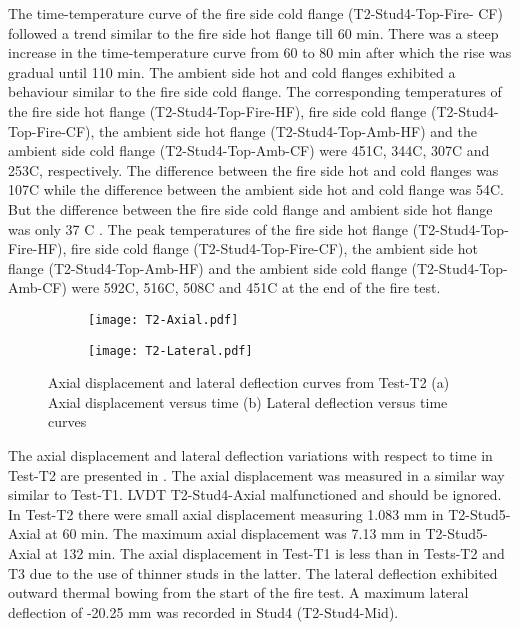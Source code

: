 The time-temperature curve of the fire side cold flange (T2-Stud4-Top-Fire- CF) followed a trend similar to the fire side hot flange till 60 min. There was a steep increase in the time-temperature curve from 60 to 80 min after which the rise was gradual until 110 min. The ambient side hot and cold flanges exhibited a behaviour similar to the fire side cold flange. The corresponding temperatures of the fire side hot flange (T2-Stud4-Top-Fire-HF), fire side cold flange (T2-Stud4-Top-Fire-CF), the ambient side hot flange (T2-Stud4-Top-Amb-HF) and the ambient side cold flange (T2-Stud4-Top-Amb-CF) were 451\degree C, 344\degree C, 307\degree C and 253\degree C, respectively. The difference between the fire side hot and cold flanges was 107\degree C while the difference between the ambient side hot and cold flange was 54\degree C. But the difference between the fire side cold flange and ambient side hot flange was only 37 \degree C . The peak temperatures of the fire side hot flange (T2-Stud4-Top-Fire-HF), fire side cold flange (T2-Stud4-Top-Fire-CF), the ambient side hot flange (T2-Stud4-Top-Amb-HF) and the ambient side cold flange (T2-Stud4-Top-Amb-CF) were 592\degree C, 516\degree C, 508\degree C and 451\degree C at the end of the fire test.
\begin{figure}[!htbp]
	\centering
	\begin{subfigure}[b]{0.7\textwidth}
		\centering
		\texttt{[image: T2-Axial.pdf]}
		\caption{}
		\label{subfig:T2-Axial}
	\end{subfigure}
	\begin{subfigure}[b]{0.7\textwidth}
		\centering
		\texttt{[image: T2-Lateral.pdf]}
		\caption{}
		\label{subfig:T2-Lateral}
	\end{subfigure}
	   \caption{Axial displacement and lateral deflection curves from Test-T2 (a) Axial displacement versus time (b) Lateral deflection versus time curves}
	   \label{fig:T2-Axial-Lateral}
\end{figure}

The axial displacement and lateral deflection variations with respect to time in Test-T2 are presented in . The axial displacement was measured in a similar way similar to Test-T1. LVDT T2-Stud4-Axial malfunctioned and should be ignored. In Test-T2 there were small axial displacement measuring 1.083 mm in T2-Stud5-Axial at 60 min. The maximum axial displacement was 7.13 mm in T2-Stud5-Axial at 132 min. The axial displacement in Test-T1 is less than in Tests-T2 and T3 due to the use of thinner studs in the latter. The lateral deflection exhibited outward thermal bowing from the start of the fire test. A maximum lateral deflection of -20.25 mm was recorded in Stud4 (T2-Stud4-Mid). 

